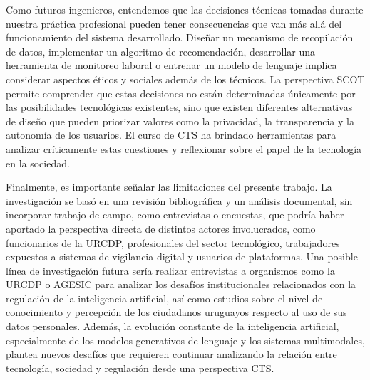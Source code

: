 \documentclass[11pt,a4paper]{article}
\begin{document}
Como futuros ingenieros, entendemos que las decisiones técnicas tomadas durante nuestra práctica profesional pueden tener consecuencias que van más allá del funcionamiento del sistema desarrollado. Diseñar un mecanismo de recopilación de datos, implementar un algoritmo de recomendación, desarrollar una herramienta de monitoreo laboral o entrenar un modelo de lenguaje implica considerar aspectos éticos y sociales además de los técnicos. La perspectiva SCOT permite comprender que estas decisiones no están determinadas únicamente por las posibilidades tecnológicas existentes, sino que existen diferentes alternativas de diseño que pueden priorizar valores como la privacidad, la transparencia y la autonomía de los usuarios. El curso de CTS ha brindado herramientas para analizar críticamente estas cuestiones y reflexionar sobre el papel de la tecnología en la sociedad.

Finalmente, es importante señalar las limitaciones del presente trabajo. La investigación se basó en una revisión bibliográfica y un análisis documental, sin incorporar trabajo de campo, como entrevistas o encuestas, que podría haber aportado la perspectiva directa de distintos actores involucrados, como funcionarios de la URCDP, profesionales del sector tecnológico, trabajadores expuestos a sistemas de vigilancia digital y usuarios de plataformas. Una posible línea de investigación futura sería realizar entrevistas a organismos como la URCDP o AGESIC para analizar los desafíos institucionales relacionados con la regulación de la inteligencia artificial, así como estudios sobre el nivel de conocimiento y percepción de los ciudadanos uruguayos respecto al uso de sus datos personales. Además, la evolución constante de la inteligencia artificial, especialmente de los modelos generativos de lenguaje y los sistemas multimodales, plantea nuevos desafíos que requieren continuar analizando la relación entre tecnología, sociedad y regulación desde una perspectiva CTS.
\end{document}
